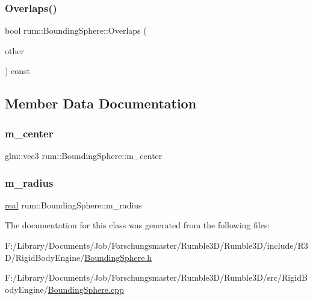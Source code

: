 \mbox{\label{classrum_1_1_bounding_sphere_a7e6b47e6ec7600266a2df32a04e3b075}} 
\subsubsection{\texorpdfstring{Overlaps()}{Overlaps()}}
{\footnotesize\ttfamily bool rum\+::\+Bounding\+Sphere\+::\+Overlaps (\begin{DoxyParamCaption}\item[{const \hyperlink{classrum_1_1_bounding_sphere}{Bounding\+Sphere} $\ast$}]{other }\end{DoxyParamCaption}) const}



\subsection{Member Data Documentation}
\mbox{\label{classrum_1_1_bounding_sphere_acc7a118371f95f36831b12c1862fbfb1}} 
\subsubsection{\texorpdfstring{m\+\_\+center}{m\_center}}
{\footnotesize\ttfamily glm\+::vec3 rum\+::\+Bounding\+Sphere\+::m\+\_\+center\hspace{0.3cm}{\ttfamily [protected]}}

\mbox{\label{classrum_1_1_bounding_sphere_acc810ba77f514caeef45a248f2ffb67c}} 
\subsubsection{\texorpdfstring{m\+\_\+radius}{m\_radius}}
{\footnotesize\ttfamily \hyperlink{namespacerum_a7e8cca23573d5eaead0f138cbaa4862c}{real} rum\+::\+Bounding\+Sphere\+::m\+\_\+radius\hspace{0.3cm}{\ttfamily [protected]}}



The documentation for this class was generated from the following files\+:\begin{DoxyCompactItemize}
\item 
F\+:/\+Library/\+Documents/\+Job/\+Forschungsmaster/\+Rumble3\+D/\+Rumble3\+D/include/\+R3\+D/\+Rigid\+Body\+Engine/\hyperlink{_bounding_sphere_8h}{Bounding\+Sphere.\+h}\item 
F\+:/\+Library/\+Documents/\+Job/\+Forschungsmaster/\+Rumble3\+D/\+Rumble3\+D/src/\+Rigid\+Body\+Engine/\hyperlink{_bounding_sphere_8cpp}{Bounding\+Sphere.\+cpp}\end{DoxyCompactItemize}
